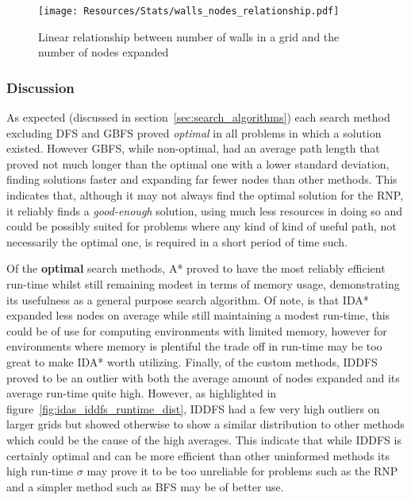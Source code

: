\begin{figure}[H]
	\centering
	\texttt{[image: Resources/Stats/walls\_nodes\_relationship.pdf]}
	\caption{Linear relationship between number of walls in a grid and the number of nodes expanded}
	\label{fig:expanded_walls_relationship}
\end{figure}

\subsubsection{Discussion} %
\label{sub:discussion}
As expected (discussed in section~\ref{sec:search_algorithms}) each search method excluding DFS and GBFS proved \textit{optimal} in all problems in which a solution existed. However GBFS, while non-optimal, had an average path length that proved not much longer than the optimal one with a lower standard deviation, finding solutions faster and expanding far fewer nodes than other methods. This indicates that, although it may not always find the optimal solution for the RNP, it reliably finds a \textit{good-enough} solution, using much less resources in doing so and could be possibly suited for problems where any kind of kind of useful path, not necessarily the optimal one, is required in a short period of time such.
\par
Of the \textbf{optimal} search methods, A* proved to have the most reliably efficient run-time whilst still remaining modest in terms of memory usage, demonstrating its usefulness as a general purpose search algorithm. Of note, is that IDA* expanded less nodes on average while still maintaining a modest run-time, this could be of use for computing environments with limited memory, however for environments where memory is plentiful the trade off in run-time may be too great to make IDA* worth utilizing. Finally, of the custom methods, IDDFS proved to be an outlier with both the average amount of nodes expanded and its average run-time quite high. However, as highlighted in figure~\ref{fig:idas_iddfs_runtime_dist}, IDDFS had a few very high outliers on larger grids but showed otherwise to show a similar distribution to other methods which could be the cause of the high averages. This indicate that while IDDFS is certainly optimal and can be more efficient than other uninformed methods its high run-time $\sigma$ may prove it to be too unreliable for problems such as the RNP and a simpler method such as BFS may be of better use.


